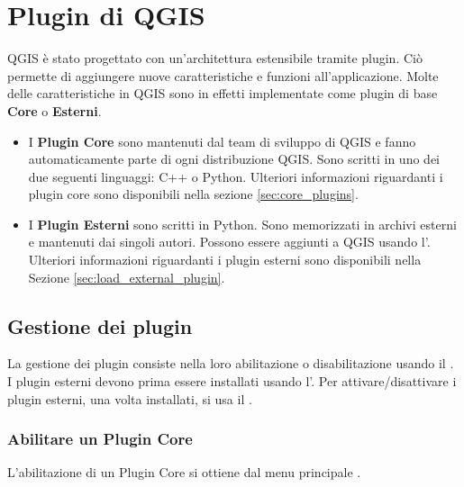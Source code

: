 
\chapter{Plugin di QGIS}\label{sec:plugins}


QGIS è stato progettato con un'architettura estensibile tramite plugin. 
Ciò permette di aggiungere nuove caratteristiche e funzioni
all'applicazione. Molte delle caratteristiche in QGIS sono in effetti implementate come plugin di
base \textbf{Core} o \textbf{Esterni}. 

\begin{itemize}[label=--]
\item I \textbf{Plugin Core} sono mantenuti dal team di sviluppo di QGIS e fanno automaticamente 
parte di ogni distribuzione QGIS.
Sono scritti in uno dei due seguenti linguaggi: C++ o Python.
Ulteriori informazioni riguardanti i plugin core sono disponibili nella sezione \ref{sec:core_plugins}.
\item I \textbf{Plugin Esterni} sono scritti in Python.
Sono memorizzati in archivi esterni e mantenuti dai singoli autori.
Possono essere aggiunti a QGIS usando l'.
Ulteriori informazioni riguardanti i plugin esterni sono disponibili nella Sezione \ref{sec:load_external_plugin}.
\end{itemize}

\section{Gestione dei plugin}\label{sec:managing_plugins}

La gestione dei plugin consiste nella loro abilitazione o disabilitazione usando il .
I plugin esterni devono prima essere installati usando l'.
Per attivare/disattivare i plugin esterni, una volta installati, si usa il .

\subsection{Abilitare un Plugin Core}\label{sec:load_core_plugin} 

L'abilitazione di un Plugin Core si ottiene dal menu principale  \arrow 
{}.

